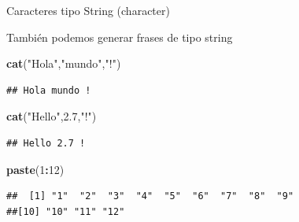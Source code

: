 \documentclass[ignorenonframetext,]{beamer}
\newenvironment{Shaded}{\begin{snugshade}}{\end{snugshade}}
\newcommand{\KeywordTok}[1]{\textcolor[rgb]{0.13,0.29,0.53}{\textbf{#1}}}
\newcommand{\DecValTok}[1]{\textcolor[rgb]{0.00,0.00,0.81}{#1}}
\newcommand{\FloatTok}[1]{\textcolor[rgb]{0.00,0.00,0.81}{#1}}
\newcommand{\StringTok}[1]{\textcolor[rgb]{0.31,0.60,0.02}{#1}}
\newcommand{\OperatorTok}[1]{\textcolor[rgb]{0.81,0.36,0.00}{\textbf{#1}}}
\newcommand{\NormalTok}[1]{#1}
\begin{document}
\begin{frame}[fragile]{Caracteres tipo String (character)}

También podemos generar frases de tipo string

\begin{Shaded}
\begin{Highlighting}[]
\KeywordTok{cat}\NormalTok{(}\StringTok{"Hola"}\NormalTok{,}\StringTok{"mundo"}\NormalTok{,}\StringTok{"!"}\NormalTok{)}
\end{Highlighting}
\end{Shaded}

\begin{verbatim}
## Hola mundo !
\end{verbatim}

\begin{Shaded}
\begin{Highlighting}[]
\KeywordTok{cat}\NormalTok{(}\StringTok{"Hello"}\NormalTok{,}\FloatTok{2.7}\NormalTok{,}\StringTok{"!"}\NormalTok{)}
\end{Highlighting}
\end{Shaded}

\begin{verbatim}
## Hello 2.7 !
\end{verbatim}

\begin{Shaded}
\begin{Highlighting}[]
\KeywordTok{paste}\NormalTok{(}\DecValTok{1}\OperatorTok{:}\DecValTok{12}\NormalTok{)}
\end{Highlighting}
\end{Shaded}

\begin{verbatim}
##  [1] "1"  "2"  "3"  "4"  "5"  "6"  "7"  "8"  "9" 
##[10] "10" "11" "12"
\end{verbatim}

\end{frame}
\end{document}
